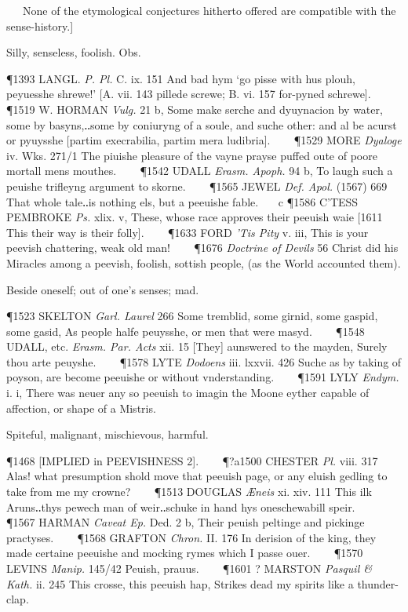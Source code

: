 \begin{description}[wide, labelwidth=!, labelindent=0pt]
   None of the etymological conjectures hitherto offered are compatible with the sense-history.]
\vspace{-0.3cm}

\begin{myenumerate}
 Silly, senseless, foolish. Obs.

\P 1393 LANGL.  \textit{P. Pl.} C. ix. 151 And bad hym ‘go pisse with hus plouh, peyuesshe shrewe!’ [A. vii. 143 pillede screwe; B. vi. 157 for-pyned schrewe].    
\P 1519 W. HORMAN  \textit{Vulg.} 21 b, Some make serche and dyuynacion by water, some by basyns,‥some by coniuryng of a soule, and suche other: and al be acurst or pyuysshe [partim execrabilia, partim mera ludibria].    
\P 1529 MORE  \textit{Dyaloge} iv. Wks. 271/1 The piuishe pleasure of the vayne prayse puffed oute of poore mortall mens mouthes.    
\P 1542 UDALL  \textit{Erasm. Apoph.} 94 b, To laugh such a peuishe trifleyng argument to skorne.    
\P 1565 JEWEL  \textit{Def. Apol.} (1567) 669 That whole tale‥is nothing els, but a peeuishe fable.    c 
\P 1586 C'TESS  PEMBROKE \textit{Ps.} xlix. v, These, whose race approves their peeuish waie [1611 This  their way is their folly].    
\P 1633 FORD  \textit{'Tis Pity} v. iii, This is your peevish chattering, weak old man!    
\P 1676 \textit{Doctrine  of Devils} 56 Christ did his Miracles among a peevish, foolish, sottish people, (as the World accounted them).

 Beside oneself; out of one's senses; mad.

\P 1523 SKELTON  \textit{Garl. Laurel} 266 Some tremblid, some girnid, some gaspid, some gasid, As people halfe peuysshe, or men that were masyd.    
\P 1548 UDALL, etc. \textit{Erasm. Par. Acts} xii. 15 [They] aunswered to the mayden, Surely thou arte peuyshe.    
\P 1578 LYTE  \textit{Dodoens} iii. lxxvii. 426 Suche as by taking of poyson, are become peeuishe or without vnderstanding.    
\P 1591 LYLY  \textit{Endym.} i. i, There was neuer any so peeuish to imagin the Moone eyther capable of affection, or shape of a Mistris.

 Spiteful, malignant, mischievous, harmful.

\P 1468 [IMPLIED in  PEEVISHNESS 2].     
\P ?a1500 CHESTER  \textit{Pl.} viii. 317 Alas! what presumption shold move that peeuish page, or any eluish gedling to take from me my crowne?    
\P 1513 DOUGLAS  \textit{Æneis} xi. xiv. 111 This ilk Aruns‥thys pewech man of weir‥schuke in hand hys oneschewabill speir.    
\P 1567 HARMAN  \textit{Caveat Ep.} Ded. 2 b, Their peuish peltinge and pickinge practyses.    
\P 1568 GRAFTON  \textit{Chron.} II. 176 In derision of the king, they made certaine peeuishe and mocking rymes which I passe ouer.    
\P 1570 LEVINS  \textit{Manip.} 145/42 Peuish, prauus.    
\P 1601 ?  MARSTON \textit{Pasquil \& Kath.} ii. 245 This crosse, this peeuish hap, Strikes dead my spirits like a thunder-clap.


\end{myenumerate}
\end{description}
